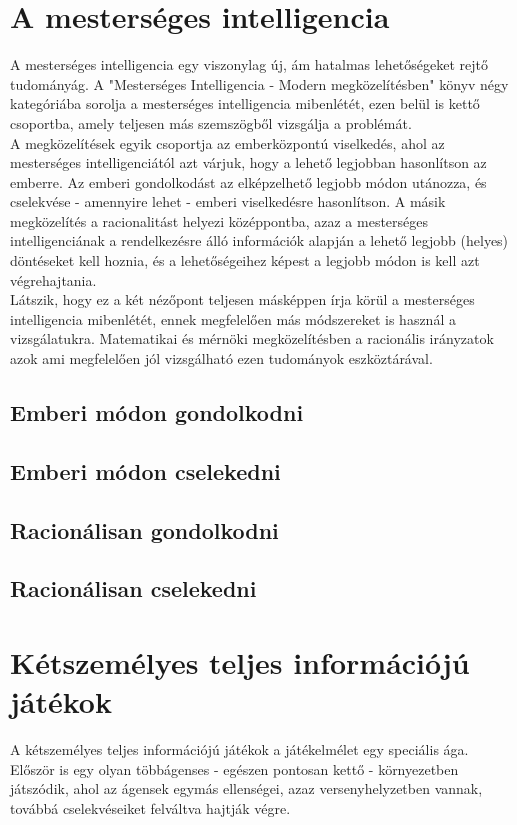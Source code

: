 \label{Chap:tema}

\section {A mesterséges intelligencia}
A mesterséges intelligencia egy viszonylag új, ám hatalmas lehetőségeket rejtő tudományág. A "Mesterséges Intelligencia - Modern megközelítésben" könyv négy kategóriába sorolja a mesterséges intelligencia mibenlétét, ezen belül is kettő csoportba, amely teljesen más szemszögből vizsgálja a problémát.\\

A megközelítések egyik csoportja az emberközpontú viselkedés, ahol az mesterséges intelligenciától azt várjuk, hogy a lehető legjobban hasonlítson az emberre. Az emberi gondolkodást az elképzelhető legjobb módon utánozza, és cselekvése - amennyire lehet - emberi viselkedésre hasonlítson. A másik megközelítés a racionalitást helyezi középpontba, azaz a mesterséges intelligenciának a rendelkezésre álló információk alapján a lehető legjobb (helyes) döntéseket kell hoznia, és a lehetőségeihez képest a legjobb módon is kell azt végrehajtania. \\

Látszik, hogy ez a két nézőpont teljesen másképpen írja körül a mesterséges intelligencia mibenlétét, ennek megfelelően más módszereket is használ a vizsgálatukra. Matematikai és mérnöki megközelítésben a racionális irányzatok azok ami megfelelően jól vizsgálható ezen tudományok eszköztárával.\\

\subsection{Emberi módon gondolkodni}
\subsection{Emberi módon cselekedni}
\subsection{Racionálisan gondolkodni}
\subsection{Racionálisan cselekedni}

\section{Kétszemélyes teljes információjú játékok}
A kétszemélyes teljes információjú játékok a játékelmélet egy speciális ága. Először is egy olyan többágenses - egészen pontosan kettő - környezetben játszódik, ahol az ágensek egymás ellenségei, azaz versenyhelyzetben vannak, továbbá cselekvéseiket felváltva hajtják végre.\\


